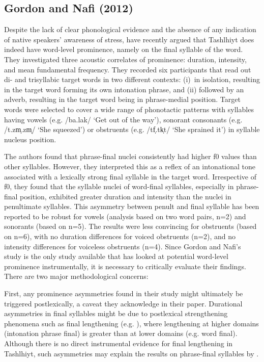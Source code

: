 \subsection{Gordon and Nafi (2012)}
Despite the lack of clear phonological evidence and the absence of any indication of native speakers’ awareness of stress, \citet{GordonNafi2012} have recently argued that Tashlhiyt does indeed have word-level prominence, namely on the final syllable of the word. They investigated three acoustic correlates of prominence: duration, intensity, and mean fundamental frequency. They recorded six participants that read out di- and trisyllabic target words in two different contexts: (i)~in isolation, resulting in the target word forming its own intonation phrase, and (ii) followed by an adverb, resulting in the target word being in phrase-medial position. Target words were selected to cover a wide range of phonotactic patterns with syllables having vowels (e.g. /ba.lak/ ‘Get out of the way’), sonorant consonants (e.g. /t.zm̩.zm̩/ ‘She squeezed’) or obstruents (e.g. /tf̩.tk̩t/ ‘She sprained it’) in syllable nucleus position.

The authors found that phrase-ﬁnal nuclei consistently had higher f0 values than other syllables. However, they interpreted this as a reflex of an intonational tone associated with a lexically strong final syllable in the target word. Irrespective of f0, they found that the syllable nuclei of word-final syllables, especially in phrase-final position, exhibited greater duration and intensity than the nuclei in penultimate syllables. This asymmetry between penult and final syllable has been reported to be robust for vowels (analysis based on two word pairs, n=2) and sonorants (based on n=5). The results were less convincing for obstruents (based on n=6), with no duration differences for voiced obstruents (n=2), and no intensity differences for voiceless obstruents (n=4). Since Gordon and Nafi’s study is the only study available that has looked at potential word-level prominence instrumentally, it is necessary to critically evaluate their findings. There are two major methodological concerns:

First, any prominence asymmetries found in their study might ultimately be triggered postlexically, a caveat they acknowledge in their paper. Durational asymmetries in final syllables might be due to postlexical strengthening phenomena such as final lengthening (e.g. \citealt{BeckmanEdwards1990,Edwards.etal1991,GussenhovenRietveld1992,Cho2005}), where lengthening at higher domains (intonation phrase final) is greater than at lower domains (e.g. word final). Although there is no direct instrumental evidence for final lengthening in Tashlhiyt, such asymmetries may explain the results on phrase-final syllables by \citet{GordonNafi2012}.

